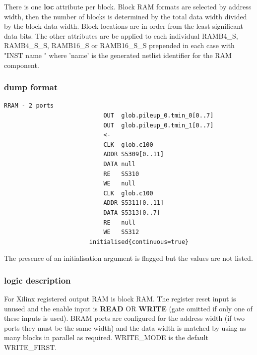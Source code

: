 \documentclass[10pt,a4paper,twoside,fleqn]{book}
\begin{document}
                    There is one {\bf loc} attribute per block. Block RAM formats
                    are selected by address width, then the number of blocks is
                    determined by the total data width divided by the block data width.
                    Block locations are in order from the least significant data bits.
                    The other attributes are be applied to each
                    individual RAMB4\_S, RAMB4\_S\_S, RAMB16\_S or
                    RAMB16\_S\_S prepended in each case with "INST name "
                    where 'name' is the generated netlist identifier for the
                    RAM component.

                \subsubsection{dump format}

                    \begin{lstlisting}[gobble=20, language=tde]
                        RRAM - 2 ports
                            OUT  glob.pileup_0.tmin_0[0..7]
                            OUT  glob.pileup_0.tmin_1[0..7]
                            <-
                            CLK  glob.c100
                            ADDR S5309[0..11]
                            DATA null
                            RE   S5310
                            WE   null
                            CLK  glob.c100
                            ADDR S5311[0..11]
                            DATA S5313[0..7]
                            RE   null
                            WE   S5312
                        initialised{continuous=true}
                    \end{lstlisting}

                    The presence of an initialisation argument is flagged
                    but the values are not listed.

                \subsubsection{logic description}

                    For Xilinx registered output RAM is block RAM. The register
                    reset input is unused and the enable input is {\bf READ}
                    OR {\bf WRITE} (gate omitted if only one of these inputs is
                    used). BRAM ports are configured for the address width (if
                    two ports they must be the same width) and the data width
                    is matched by using as many blocks in parallel as required.
                    WRITE\_MODE is the default WRITE\_FIRST.
                    
\end{document}

